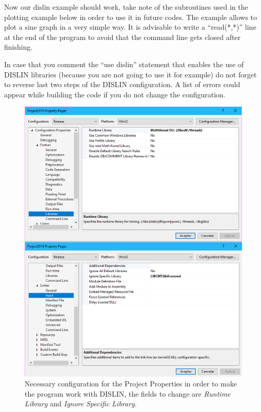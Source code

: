 Now our dislin example should work, take note of the subroutines used in the plotting example below in order to use it in future codes. The example allows to plot a sine graph in a very simple way. It is advisable to write a ``read(*,*)'' line at the end of the program to avoid that the command line gets closed after finishing. \vspace{0.5cm}

 

\begin{IN}
    In case that you comment the ``use dislin'' statement that enables the use of DISLIN libraries (because you are not going to use it for example) do not forget to reverse last two steps of the DISLIN configuration. A list of errors could appear while building the code if you do not change the configuration. 
\end{IN}


\begin{figure}
    \centering
    \includegraphics[width= \linewidth ]{Figures/Config5}
    \caption{Necessary configuration for the Project Properties in order to make the program work with DISLIN, the fields to change are \textit{Runtime Library} and \textit{Ignore Specific Library}.}
    \label{fig:Config5}
\end{figure}

